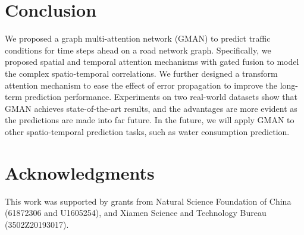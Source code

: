 \documentclass[letterpaper]{article} \usepackage{aaai20}  \usepackage{times}  \usepackage{helvet} \usepackage{courier}  \usepackage[hyphens]{url}  \usepackage{graphicx} \usepackage{amsmath}
\begin{document}
\section{Conclusion}

We proposed a graph multi-attention network (GMAN) to predict traffic conditions for time steps ahead on a road network graph. Specifically, we proposed spatial and temporal attention mechanisms with gated fusion to model the complex spatio-temporal correlations. We further designed a transform attention mechanism to ease the effect of error propagation to improve the long-term prediction performance. Experiments on two real-world datasets show that GMAN achieves state-of-the-art results, and the advantages are more evident as the predictions are made into far future. In the future, we will apply GMAN to other spatio-temporal prediction tasks, such as water consumption prediction. 

\section{Acknowledgments}

This work was supported by grants from Natural Science Foundation of China (61872306 and U1605254), and Xiamen Science and Technology Bureau (3502Z20193017).



\end{document}
